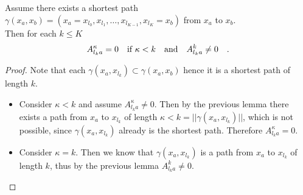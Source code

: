 \begin{lemma}{}{}
	Assume there exists a shortest path \\ 
	$\gamma(x_a,x_b) = (x_a=x_{l_0},x_{l_1},\ldots,x_{l_{K-1}},x_{l_K} =x_b) $ 
	from $x_a$ to $x_b$. \\
	Then for each $k \leq K $
	\begin{equation}
	A^\kappa_{l_k a}  = 0  \quad \text{if }\kappa <k \quad \text{and} \quad A^k_{l_k a} \neq 0
	\quad .
	\end{equation}
\end{lemma}
\begin{proof}
	Note that each $\gamma(x_a,x_{l_k})\subset \gamma(x_a,x_b)$ hence it is a 
	shortest path of length $k$. \\
	\begin{itemize}
	\item
	Consider $\kappa < k$ and assume $A^\kappa_{l_k a}\neq 0$. Then by the previous 
	lemma there exists a path from $x_a$ to $x_{l_k}$ of length $\kappa <k=
	||\gamma(x_a,x_{l_k})||$, 
	which is not possible, since $\gamma(x_a,x_{l_k})$ already is the shortest path.
	 Therefore $A^\kappa_{l_k a}=0$.
	\item	
	Consider $\kappa = k$. Then we know that $\gamma(x_a,x_{l_k})$ is a path from 
	$x_a$ to $x_{l_k}$ of length $k$, thus by the previous lemma $A^k_{l_k a}\neq 0$.  
	\end{itemize}
\end{proof}


